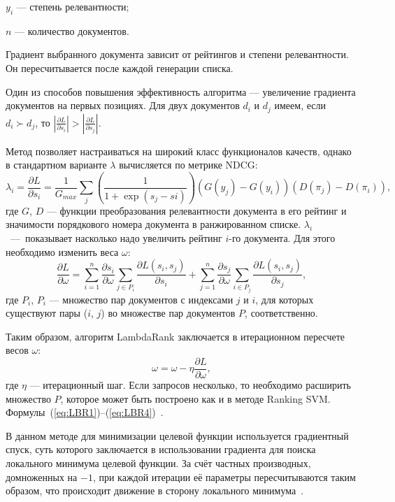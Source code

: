 $y_{i}$ --- степень релевантности;

$n$ --- количество документов. 

Градиент выбранного документа зависит от рейтингов и степени релевантности. Он пересчитывается после каждой генерации списка.

Один из способов повышения эффективность алгоритма  --- увеличение градиента документов на первых позициях. Для двух документов $d_{i}$ и $d_{j}$ имеем, если $d_{i} \succ d_{j}$, то $| \frac{\partial L}{\partial s_{i}} | > | \frac{\partial L}{\partial s_{j}} |$.

Метод позволяет настраиваться на широкий класс функционалов качеств, однако в стандартном варианте $\lambda$ вычисляется по метрике NDCG:
\begin{equation}
	\label{eq:LBR2}
	\lambda_{i} = \frac{\partial L}{\partial s_{i}} = \frac{1}{G_{max}} \sum_{j}(\frac{1}{1 + \exp(s_{j} - s{i})})(G(y_{j}) - G(y_{i}))(D(\pi_{j}) - D(\pi_{i})),
\end{equation}
где  $G$, $D$ ---  функции преобразования релевантности документа в его рейтинг и значимости порядкового номера документа в ранжированном списке.  $\lambda_{i}$~---~показывает насколько надо увеличить рейтинг $i$-го документа. Для этого необходимо изменить веса $\omega$:
\begin{equation}
	\label{eq:LBR3}
	\frac{\partial L}{\partial \omega} = \sum_{i=1}^{n}\frac{\partial s_{i}}{\partial \omega}\sum_{j \in P_{i}}\frac{\partial L(s_{i}, s_{j})}{\partial s_{i}} + \sum_{j=1}^{n}\frac{\partial s_{j}}{\partial \omega}\sum_{i \in P_{j}}\frac{\partial L(s_{i}, s_{j})}{\partial s_{j}},
\end{equation}
где $P_{i}$, $P_{i}$ --- множество пар документов с индексами $j$ и $i$, для которых существуют пары ($i$, $j$) во множестве пар документов $P$, соответственно.

Таким образом, алгоритм LambdaRank заключается в итерационном пересчете весов $\omega$:
\begin{equation}
	\label{eq:LBR4}
	\omega = \omega - \eta\frac{\partial L}{\partial \omega},
\end{equation}
где $\eta$ --- итерационный шаг. Если запросов несколько, то необходимо расширить множество $P$, которое может быть построено как и в методе Ranking SVM. Формулы~(\ref{eq:LBR1})--(\ref{eq:LBR4})~\cite{LamdaRank}.

В данном методе для минимизации целевой функции используется градиентный спуск, суть которого заключается в использовании градиента для поиска локального минимума целевой функции. За счёт частных производных, домноженных на $-1$, при каждой итерации её параметры пересчитываются таким образом, что происходит движение в сторону локального минимума~\cite{ML_no_wors}.


